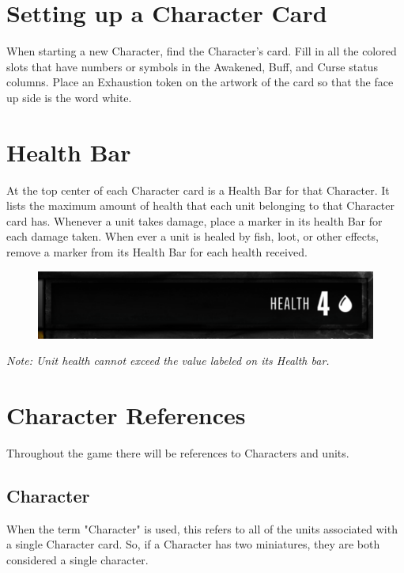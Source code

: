 \documentclass[../main.tex]{subfiles}
\begin{document}
\section{Setting up a Character Card}
When starting a new Character, find the Character's card. Fill in all the colored slots that have numbers or symbols in the Awakened, Buff, and Curse status columns. Place an Exhaustion token on the artwork of the card so that the face up side is the word white. 

\section{Health Bar}
At the top center of each Character card is a Health Bar for that Character. It lists the maximum amount of health that each unit belonging to that Character card has. Whenever a unit takes damage, place a marker in its health Bar for each damage taken. When ever a unit is healed by fish, loot, or other effects, remove a marker from its Health Bar for each health received. 

\begin{figure}[h]
    \centering
    \includegraphics[width=1\linewidth]{chapters//Settingupacharactercard/TimeStrikeCharCardHealth.png}
\end{figure}

\textit{Note: Unit health cannot exceed the value labeled on its Health bar. }

\section{Character References}
Throughout the game there will be references to Characters and units. 

\subsection{Character}
When the term "Character" is used, this refers to all of the units associated with a single Character card. So, if a Character has two miniatures, they are both considered a single character. 
\end{document}
